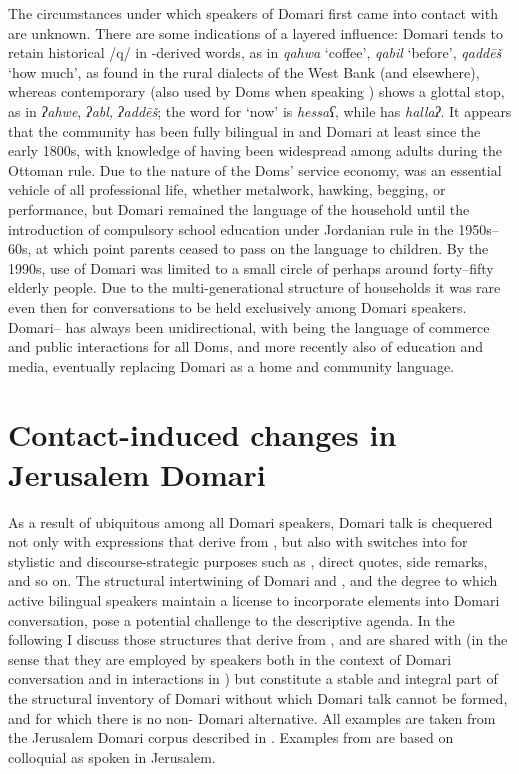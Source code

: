 \documentclass[output=paper]{langsci/langscibook}
\begin{document}
The circumstances under which speakers of Domari first came into contact with  are unknown. There are some indications of a layered influence: Domari tends to retain historical /q/ in -derived words, as in \textit{qahwa} ‘coffee’, \textit{qabil} ‘before’, \textit{qaddēš} ‘how much’, as found in the rural dialects of the West Bank (and elsewhere), whereas contemporary   (also used by Doms when speaking ) shows a glottal stop, as in \textit{ʔahwe}, \textit{ʔabl,} \textit{ʔaddēš}; the word for ‘now’ is \textit{hessaʕ}, while   has \textit{hallaʔ}. It appears that the community has been fully bilingual in  and Domari at least since the early 1800s, with knowledge of  having been widespread among adults during the Ottoman rule. Due to the nature of the Doms’ service economy,  was an essential vehicle of all professional life, whether metalwork, hawking, begging, or performance, but Domari remained the language of the household until the introduction of compulsory school education under {Jordanian} rule in the 1950s–60s, at which point parents ceased to pass on the language to children. By the 1990s, use of Domari was limited to a small circle of perhaps around forty–fifty elderly people. Due to the multi-generational structure of households it was rare even then for conversations to be held exclusively among Domari speakers. Domari–  has always been unidirectional, with  being the language of commerce and public interactions for all Doms, and more recently also of education and media, eventually replacing Domari as a home and community language.

\section{Contact-induced changes in Jerusalem Domari}

As a result of ubiquitous  among all Domari speakers, Domari talk is chequered not only with expressions that derive from , but also with switches into  for stylistic and discourse-strategic purposes such as , direct quotes, side remarks, and so on. The structural intertwining of Domari and , and the degree to which active bilingual speakers maintain a license to incorporate  elements into Domari conversation, pose a potential challenge to the descriptive agenda. In the following I discuss those structures that derive from , and are shared with  (in the sense that they are employed by speakers both in the context of Domari conversation and in interactions in ) but constitute a stable and integral part of the structural inventory of Domari without which Domari talk cannot be formed, and for which there is no non- Domari alternative. All examples are taken from the Jerusalem Domari corpus described in \citet{Matras2012}. Examples from  are based on colloquial   as spoken in Jerusalem.
\end{document}
